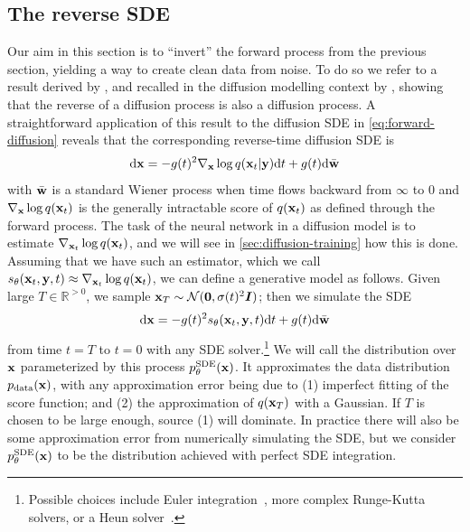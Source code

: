 \subsection{The reverse SDE} \label{sec:diffusion-reverse-sde}
Our aim in this section is to ``invert'' the forward process from the previous section, yielding a way to create clean data from noise. To do so we refer to a result  derived by \citet{anderson1982reverse}, and recalled in the diffusion modelling context by \citet{song2020score}, showing that the reverse of a diffusion process is also a diffusion process. A straightforward application of this result to the diffusion SDE in \cref{eq:forward-diffusion} reveals that the corresponding reverse-time diffusion SDE is
\begin{equation} \label{eq:reverse-diffusion}
    \mathrm{d}{\mathbf{x}} = -g(t)^2 \nabla_{\mathbf{x}} \log q({\mathbf{x}}_t|{\mathbf{y}}) \mathrm{d}t + g(t) \mathrm{d}\bar{{\mathbf{w}}}
\end{equation}
with $\bar{{\mathbf{w}}}$ is a standard Wiener process when time flows backward from $\infty$ to $0$ and $\nabla_{\mathbf{x}} \log q({\mathbf{x}}_t)$ is the generally intractable score of $q({\mathbf{x}}_t)$ as defined through the forward process. The task of the neural network in a diffusion model is to estimate $\nabla_{{\mathbf{x}}_t} \log q({\mathbf{x}}_t)$, and we will see in \cref{sec:diffusion-training} how this is done. Assuming that we have such an estimator, which we call $s_\theta({\mathbf{x}}_t, {\mathbf{y}}, t) \approx \nabla_{{\mathbf{x}}_t} \log q({\mathbf{x}}_t)$, we can define a generative model as follows. Given large $T \in \mathbb{R}^{>0}$, we sample ${\mathbf{x}}_T \sim {\mathcal{N}}({\bm{0}}, \sigma(t)^2 {\bm{I}})$; then we simulate the SDE
\begin{equation} \label{eq:reverse-diffusion-with-nn}
    \mathrm{d}{\mathbf{x}} = -g(t)^2 s_\theta({\mathbf{x}}_t, {\mathbf{y}}, t) \mathrm{d}t + g(t) \mathrm{d}\bar{{\mathbf{w}}}
\end{equation}
from time $t=T$ to $t=0$ with any SDE solver.\footnote{Possible choices include Euler integration~\citep{ho2020denoising}, more complex Runge-Kutta~\citep{grathwohl2018ffjord} solvers, or a Heun solver~\citep{karras2022elucidating}.} We will call the distribution over ${\mathbf{x}}$ parameterized by this process $p_\theta^\text{SDE}({\mathbf{x}})$. It approximates the data distribution $p_{\rm{data}}({\mathbf{x}})$, with any approximation error being due to (1) imperfect fitting of the score function; and (2) the approximation of $q({\mathbf{x}}_T)$ with a Gaussian. If $T$ is chosen to be large enough, source (1) will dominate. In practice there will also be some approximation error from numerically simulating the SDE, but we consider $p_\theta^\text{SDE}({\mathbf{x}})$ to be the distribution achieved with perfect SDE integration.

